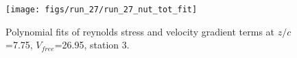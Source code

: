 \begin{figure}[H]
\centering
\texttt{[image: figs/run\_27/run\_27\_nut\_tot\_fit]}
\caption{Polynomial fits of reynolds stress and velocity gradient terms at $z/c$=7.75, $V_{free}$=26.95, station 3.}
\label{fig:run_27_nut_tot_fit}
\end{figure}


